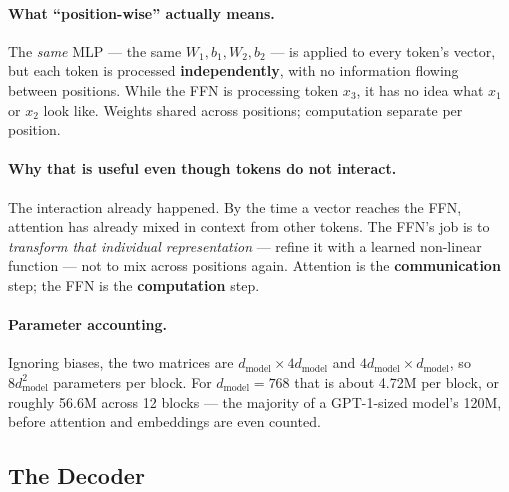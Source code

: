 \documentclass[11pt,a4paper]{article}
\begin{document}
\paragraph{What ``position-wise'' actually means.} The \emph{same} MLP --- the same $W_1, b_1,
W_2, b_2$ --- is applied to every token's vector, but each token is processed
\textbf{independently}, with no information flowing between positions. While the FFN is
processing token $x_3$, it has no idea what $x_1$ or $x_2$ look like. Weights shared across
positions; computation separate per position.

\paragraph{Why that is useful even though tokens do not interact.} The interaction already
happened. By the time a vector reaches the FFN, attention has already mixed in context from
other tokens. The FFN's job is to \emph{transform that individual representation} --- refine
it with a learned non-linear function --- not to mix across positions again. Attention is the
\textbf{communication} step; the FFN is the \textbf{computation} step.

\paragraph{Parameter accounting.} Ignoring biases, the two matrices are
$d_{\text{model}} \times 4d_{\text{model}}$ and $4d_{\text{model}} \times d_{\text{model}}$,
so $8 d_{\text{model}}^2$ parameters per block. For $d_{\text{model}} = 768$ that is about
4.72M per block, or roughly 56.6M across 12 blocks --- the majority of a GPT-1-sized model's
120M, before attention and embeddings are even counted.

\subsection{The Decoder}
\end{document}
